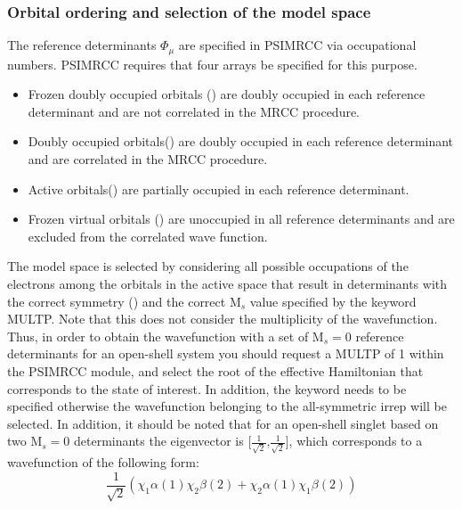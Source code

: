 \subsubsection{Orbital ordering and selection of the model space}
The reference determinants $\Phi_\mu$ are specified in PSIMRCC via occupational numbers. PSIMRCC requires that four arrays be specified for this purpose.

\begin{itemize}
\item Frozen doubly occupied orbitals () are doubly occupied in each reference determinant and are not correlated in the MRCC procedure.
\item Doubly occupied orbitals() are doubly occupied in each reference determinant and are correlated in the MRCC procedure.
\item Active orbitals() are partially occupied in each reference determinant.
\item Frozen virtual orbitals () are unoccupied in all reference determinants and are excluded from the correlated wave function.
\end{itemize} 

The model space is selected by considering all possible occupations of the electrons among the orbitals in the active space that result in determinants with the correct symmetry () and the correct $\textrm{M}_s$ value specified by the keyword MULTP. Note that this does not consider the multiplicity of the wavefunction. Thus, in order to obtain the wavefunction with a set of $\textrm{M}_s = 0$ reference determinants for an open-shell system you should request a MULTP of 1 within the PSIMRCC module, and select the root of the effective Hamiltonian that corresponds to the state of interest. In addition, the  keyword needs to be specified otherwise the wavefunction belonging to the all-symmetric irrep will be selected. In addition, it should be noted that for an open-shell singlet based on two $\textrm{M}_s = 0$ determinants the eigenvector is [$\frac{1}{\sqrt{2}}\text{,}\frac{1}{\sqrt{2}}$], which corresponds to a wavefunction of the following form:
\begin{equation*}
\frac{1}{\sqrt{2}} \left( \chi_1 \alpha (1) \chi_2 \beta (2) + \chi_2 \alpha(1) \chi_1 \beta (2) \right)
\end{equation*}  

